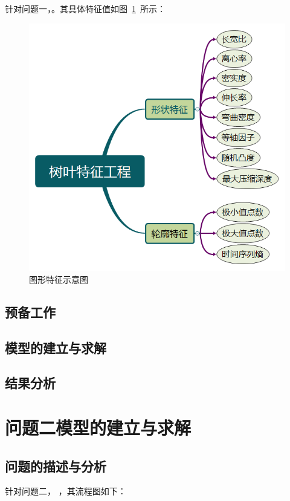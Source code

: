 \documentclass{whutmod}
\begin{document}
	针对问题一，。其具体特征值如图~\ref{77}~所示：
	    \begin{figure}[H]
		\centering
		\includegraphics[width=.6\textwidth]{figures/flt.png}
		\caption{图形特征示意图}\label{77}
    	\end{figure}
	\subsection{预备工作}
	
	
	
	
	\subsection{模型的建立与求解}
	
	     
	     
	     
	     
	 	
	  
	      	
	
	\subsection{结果分析}
	
	
	\section{问题二模型的建立与求解}
	\subsection{问题的描述与分析}
	针对问题二，
	，其流程图如下：
		
\end{document}
